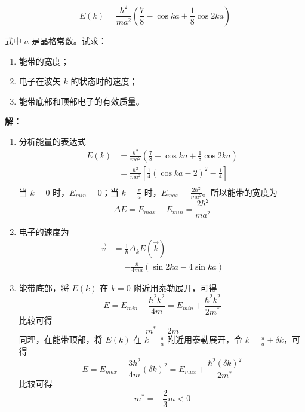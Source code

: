 \begin{equation*}
    E(k) = \frac{\hbar^2}{m a^2} \left(\frac{7}{8}-\cos ka + \frac{1}{8} \cos 2ka\right)
\end{equation*}

式中 $a$ 是晶格常数。试求：

\begin{enumerate}
    \item 能带的宽度；
    \item 电子在波矢 $k$ 的状态时的速度；
    \item 能带底部和顶部电子的有效质量。
\end{enumerate}

\noindent \textbf{解：}

\begin{enumerate}
    \item 分析能量的表达式
        \begin{align*}
            E(k) &= \frac{\hbar^2}{m a^2} \left(\frac{7}{8}-\cos{ka} + \frac{1}{8} \cos 2ka\right) \\
            &= \frac{\hbar^2}{m a^2} \left[\frac{1}{4} \left(\cos{ka}-2\right)^2 - \frac{1}{4}\right] \\
        \end{align*}
        当 $k=0$ 时，$E_{min}=0$；当 $k=\frac{\pi}{a}$ 时，$E_{max}=\frac{2\hbar^2}{m a^2}$。所以能带的宽度为
        \begin{equation*}
            \Delta E = E_{max} - E_{min} = \frac{2\hbar^2}{m a^2}
        \end{equation*}
    \item 电子的速度为
        \begin{align*}
            \vec{v} &= \frac{1}{\hbar} \Delta_k E(\vec{k}) \\
            &= -\frac{\hbar}{4ma} (\sin{2ka} - 4 \sin{ka})
        \end{align*}
    \item 能带底部，将 $E(k)$ 在 $k=0$ 附近用泰勒展开，可得
        \begin{equation*}
            E = E_{min} + \frac{\hbar^2 k^2}{4m} = E_{min} + \frac{\hbar^2 k^2}{2 m^*}
        \end{equation*}
        比较可得
        \begin{equation*}
            m^* = 2m
        \end{equation*}
        同理，在能带顶部，将 $E(k)$ 在 $k=\frac{\pi}{a}$ 附近用泰勒展开，令 $k=\frac{\pi}{a}+\delta k$，可得
        \begin{equation*}
            E = E_{max} - \frac{3\hbar^2}{4m} (\delta k)^2 = E_{max} + \frac{\hbar^2 (\delta k)^2}{2 m^*}
        \end{equation*}
        比较可得
        \begin{equation*}
            m^* = -\frac{2}{3} m < 0
        \end{equation*}
\end{enumerate}


